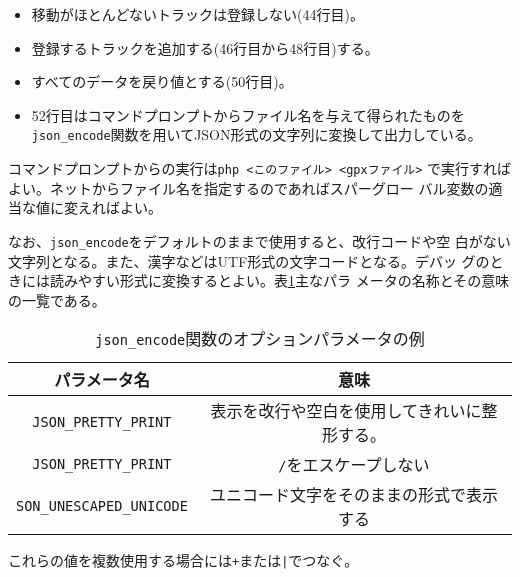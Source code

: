  \begin{itemize}
  \item 移動がほとんどないトラックは登録しない(44行目)。
  \item 登録するトラックを追加する(46行目から48行目)する。
  \item すべてのデータを戻り値とする(50行目)。
	\item 52行目はコマンドプロンプトからファイル名を与えて得られたものを
				\Verb+json_encode+関数を用いてJSON形式の文字列に変換して出力している。
 \end{itemize}
 コマンドプロンプトからの実行は\texttt{php <このファイル> <gpxファイル>}
 で実行すればよい。ネットからファイル名を指定するのであればスパーグロー
 バル変数の適当な値に変えればよい。

 
なお、\Verb+json_encode+をデフォルトのままで使用すると、改行コードや空
白がない文字列となる。また、漢字などはUTF形式の文字コードとなる。デバッ
グのときには読みやすい形式に変換するとよい。表\ref{json_encode}主なパラ
メータの名称とその意味の一覧である。
\begin{table}[htb]
 \caption{\texttt{json\_encode}関数のオプションパラメータの例}\label{json_encode}
 \begin{center}
\begin{tabular}{|c|c|}
 \hline
 パラメータ名& 意味\\\hline
 \Verb+JSON_PRETTY_PRINT+& 表示を改行や空白を使用してきれいに整形する。
		 \\ \hline
 \Verb+JSON_PRETTY_PRINT+& \texttt{/}をエスケープしない\\ \hline
 \Verb+SON_UNESCAPED_UNICODE+& ユニコード文字をそのままの形式で表示する\\ \hline
\end{tabular}
 \end{center}
\end{table}

これらの値を複数使用する場合には\texttt{+}または\texttt{|}でつなぐ。